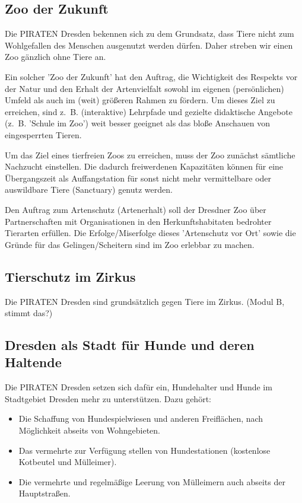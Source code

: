 \documentclass[a4paper, 11pt]{article}
\begin{document}
\subsection{Zoo der Zukunft}
Die PIRATEN Dresden bekennen sich zu dem Grundsatz, dass Tiere nicht zum Wohlgefallen des Menschen ausgenutzt werden dürfen. Daher streben wir einen Zoo gänzlich ohne Tiere an.\newline

Ein solcher 'Zoo der Zukunft' hat den Auftrag, die Wichtigkeit des Respekts vor der Natur und den Erhalt der Artenvielfalt sowohl im eigenen (persönlichen) Umfeld als auch im (weit) größeren Rahmen zu fördern. Um dieses Ziel zu erreichen, sind z. B. (interaktive) Lehrpfade und gezielte didaktische Angebote (z. B. 'Schule im Zoo') weit besser geeignet als das bloße Anschauen von eingesperrten Tieren.\newline

Um das Ziel eines tierfreien Zoos zu erreichen, muss der Zoo zunächst sämtliche Nachzucht einstellen. Die dadurch freiwerdenen Kapazitäten können für eine Übergangszeit als Auffangstation für sonst nicht mehr vermittelbare oder auswildbare Tiere (Sanctuary) genutz werden.\newline

Den Auftrag zum Artenschutz (Artenerhalt) soll der Dresdner Zoo über Partnerschaften mit Organisationen in den Herkunftshabitaten bedrohter Tierarten erfüllen. Die Erfolge/Miserfolge dieses 'Artenschutz vor Ort' sowie die Gründe für das Gelingen/Scheitern sind im Zoo erlebbar zu machen.


\subsection{Tierschutz im Zirkus}
Die PIRATEN Dresden sind grundsätzlich gegen Tiere im Zirkus. (Modul B, stimmt das?)


\subsection{Dresden als Stadt für Hunde und deren Haltende}
Die PIRATEN Dresden setzen sich dafür ein, Hundehalter und Hunde im Stadtgebiet Dresden mehr zu unterstützen. Dazu gehört:

\begin{itemize}
    \item Die Schaffung von Hundespielwiesen und anderen Freiflächen, nach Möglichkeit abseits von Wohngebieten.

    \item Das vermehrte zur Verfügung stellen von Hundestationen (kostenlose Kotbeutel und Mülleimer).

    \item Die vermehrte und regelmäßige Leerung von Mülleimern auch abseits der Hauptstraßen.
\end{itemize}
\end{document}
